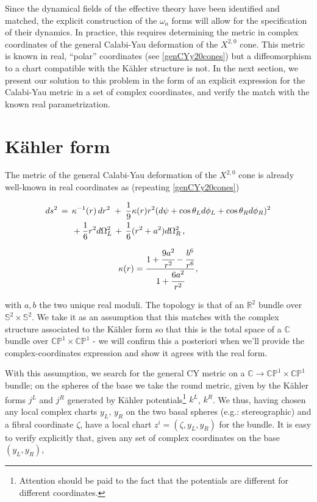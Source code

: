 Since the dynamical fields of the effective theory have been identified and matched, the explicit construction of the $\omega_a$ forms will allow for the specification of their dynamics. In practice, this requires determining the metric in complex coordinates of the general Calabi-Yau deformation of the $X^{2,0}$ cone. This metric is known in real, ``polar'' coordinates (see \eqref{genCYy20cones}) but a diffeomorphism to a chart compatible with the K\"ahler structure is not. In the next section, we present our solution to this problem in the form of an explicit expression for the Calabi-Yau metric in a set of complex coordinates, and verify the match with the known real parametrization.


\section{K\"ahler form}

The metric of the general Calabi-Yau deformation of the $X^{2,0}$ cone is already well-known in real coordinates as (repeating \eqref{genCYy20cones})

\begin{align}
\begin{split}
ds^2 \,= \;\, &\kappa^{-1}(r)\,dr^2 \;+\; \frac{1}{9} \kappa(r) r^2 \large(d\psi + \cos\theta_L d\phi_L + \cos\theta_R d\phi_R\large)^2\\
& + \frac{1}{6} r^2 d\Omega_L^2 \,+ \, \frac{1}{6}(r^2+a^2) d\Omega_R^2\,, \label{y20metric} 
\end{split}
\end{align}

\begin{equation}
	\kappa(r) = \cfrac{1 + \cfrac{9a^2}{r^2} - \cfrac{b^6}{r^6}}{1+ \cfrac{6a^2}{r^2}}\,,
\end{equation}

with $a,b$ the two unique real moduli. The topology is that of an $\mathbb{R}^2$ bundle over $\mathbb{S}^2 \times \mathbb{S}^2$. We take it as an assumption that this matches with the complex structure associated to the K\"ahler form so that this is the total space of a $\mathbb{C}$ bundle over $\mathbb{CP}^1 \times \mathbb{CP}^1$ - we will confirm this a posteriori when we'll provide the complex-coordinates expression and show it agrees with the real form.

With this assumption, we search for the general CY metric on a $\mathbb{C} \rightarrow \mathbb{CP}^1 \times \mathbb{CP}^1$ bundle; on the spheres of the base we take the round metric, given by the K\"ahler forms $j^L$ and $j^R$ generated by K\"ahler potentials\footnote{Attention should be paid to the fact that the potentials are different for different coordinates.} $k^L$, $k^R$. We thus, having chosen any local complex charts $y_L$, $y_R$ on the two basal spheres (e.g.: stereographic) and a fibral coordinate $\zeta$, have a local chart $z^i = (\zeta,y_L,y_R)$ for the bundle. It is easy to verify explicitly that, given any set of complex coordinates on the base $(y_L,y_R)$,

